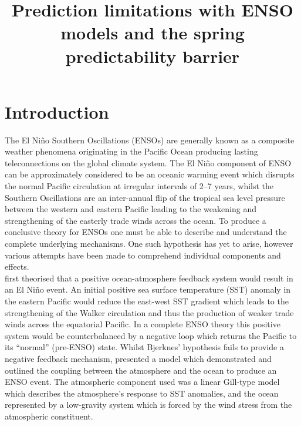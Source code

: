 \documentclass[12pt, onecolumn]{revtex4}    %
\begin{document}
                     

\title{Prediction limitations with ENSO models and the spring predictability barrier} 

\maketitle
\thispagestyle{plain} %

\section{Introduction}
The El Ni\~{n}o Southern Oscillations (ENSOs) are generally known as a composite weather phenomena originating in the Pacific Ocean producing lasting teleconnections on the global climate system. The El Ni\~{n}o component of ENSO can be approximately considered to be an oceanic warming event which disrupts the normal Pacific circulation at irregular intervals of 2--7 years, whilst the Southern Oscillations are an inter-annual flip of the tropical sea level pressure between the western and eastern Pacific leading to the weakening and strengthening of the easterly trade winds across the ocean. To produce a conclusive theory for ENSOs one must be able to describe and understand the complete underlying mechanisms. One such hypothesis has yet to arise, however various attempts have been made to comprehend individual components and effects. \\

\cite{doi:10.1175/1520-04931969097} first theorised that a positive ocean-atmosphere feedback system would result in an El Ni\~{n}o event. An initial positive sea surface temperature (SST) anomaly in the eastern Pacific would reduce the east-west SST gradient which leads to the strengthening of the Walker circulation and thus the production of weaker trade winds across the equatorial Pacific. In a complete ENSO theory this positive system would be counterbalanced by a negative loop which returns the Pacific to its ``normal'' (pre-ENSO) state. Whilst Bjerknes' hypothesis fails to provide a negative feedback mechanism, \cite{Zebiak:1987aa} presented a model which demonstrated and outlined the coupling between the atmosphere and the ocean to produce an ENSO event. The atmospheric component used was a linear Gill-type model \citep{Gill:1980aa} which describes the atmosphere's response to SST anomalies, and the ocean represented by a low-gravity system which is forced by the wind stress from the atmospheric constituent. \\
\end{document}
